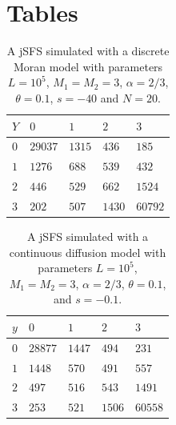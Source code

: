 \documentclass[preprint]{elsarticle}
\newcommand\y{\ensuremath{Y}}
\begin{document}
\section*{Tables}

\begin{table}[ht]
\centering
\caption{A jSFS simulated with a discrete Moran model with parameters $L=10^5$, $M_1=M_2=3$, $\alpha=2/3$, $\theta=0.1$, $s=-40$ and $N=20$.}
  \begin{tabular}{lllll}
  \toprule
    $\y$&$0$&$1$&$2$&$3$\\
    \midrule
    $0$  &$29037$ &$1315$ &$436$  &$185$\\ 
    $1$  &$1276$  &$688$  &$539$  &$432$\\  
    $2$  &$446$   &$529$  &$662$  &$1524$\\  
    $3$  &$202$   &$507$  &$1430$ &$60792$\\
    \bottomrule
  \end{tabular}\label{jointSFSdiscr}
\end{table}

\begin{table}[ht]
\centering
\caption{A jSFS simulated with a continuous diffusion model with parameters $L=10^5$, $M_1=M_2=3$, $\alpha=2/3$, $\theta=0.1$, and $s=-0.1$.}
  \begin{tabular}{lllll}
  \toprule
    $y$&$0$&$1$&$2$&$3$\\
    \midrule
    $0$  &$28877$ &$1447$ &$494$  &$231$\\
    $1$  &$1448$  &$570$  &$491$  &$557$\\
    $2$  &$497$   &$516$  &$543$  &$1491$\\
    $3$  &$253$   &$521$  &$1506$ &$60558$\\
    \bottomrule
  \end{tabular}\label{jointSFScont}
\end{table}
\end{document}
